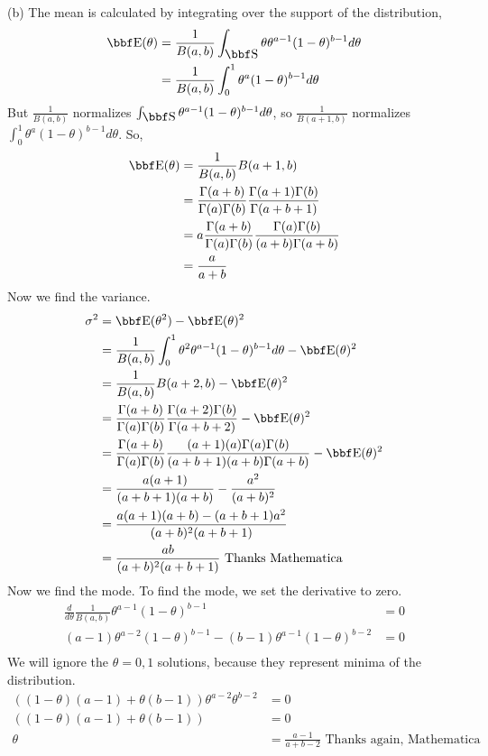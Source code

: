 \documentclass[12pt,letterpaper,fleqn]{hmcpset}
\begin{document}
\begin{solution}
    (b) The mean is calculated by integrating over the support of the distribution,
        \begin{align*}
            \EE(\theta) &= \frac{1}{B(a,b)} \int_{\SS} \theta \theta^{a-1}(1-\theta)^{b-1} d\theta \\
            &=  \frac{1}{B(a,b)} \int_{0}^1 \theta^{a}(1-\theta)^{b-1} d\theta
        \end{align*}
    But $\frac{1}{B(a,b)}$ normalizes $\int_{\SS} \theta^{a-1}(1-\theta)^{b-1} d\theta$, so $\frac{1}{B(a+1,b)}$ normalizes $\int_{0}^1 \theta^{a}(1-\theta)^{b-1} d\theta$. So,
        \begin{align*}
            \EE(\theta) &= \frac{1}{B(a,b)} B(a+1,b) \\
            &= \frac{\Gamma(a+b)}{\Gamma(a)\Gamma(b)} \frac{\Gamma(a+1)\Gamma(b)}{\Gamma(a + b +1)}\\
            &= a\frac{\Gamma(a+b)}{\Gamma(a)\Gamma(b)} \frac{\Gamma(a)\Gamma(b)}{(a+b)\Gamma(a + b)}\\
            &= \frac{a}{a+b}
        \end{align*}
        Now we find the variance. 
        \begin{align*}
            \sigma^2 &= \EE(\theta^2) - \EE(\theta)^2 \\
            &= \frac{1}{B(a,b)} \int_{0}^1 \theta^2 \theta^{a - 1}(1-\theta)^{b-1} d\theta - \EE(\theta)^2\\
            &= \frac{1}{B(a,b)} B(a+2,b) - \EE(\theta)^2 \\
            &= \frac{\Gamma(a+b)}{\Gamma(a)\Gamma(b)} \frac{\Gamma(a+2)\Gamma(b)}{\Gamma(a + b + 2)} - \EE(\theta)^2 \\
            &= \frac{\Gamma(a+b)}{\Gamma(a)\Gamma(b)} \frac{(a+1)(a)\Gamma(a)\Gamma(b)}{(a + b +1)(a+b)\Gamma(a + b)} - \EE(\theta)^2\\
            &= \frac{a(a+1)}{(a+b+1)(a+b)} - \frac{a^2}{(a+b)^2}\\
            &= \frac{a(a+1)(a+b)-(a+b+1)a^2}{(a+b)^2(a+b+1)}\\
            &= \frac{a b}{(a+b)^2 (a+b+1)} \text{  Thanks Mathematica}
        \end{align*}
        Now we find the mode. To find the mode, we set the derivative to zero.
            \begin{align*}
                \frac{d}{d \theta} \frac{1}{B(a,b)} \theta^{a-1}(1-\theta)^{b-1} &= 0\\
                (a-1)\theta^{a-2}(1-\theta)^{b-1} - (b-1)\theta^{a-1}(1-\theta)^{b-2}&=0\\   
            \end{align*}
        We will ignore the $\theta = 0,1$ solutions, because they represent minima of the distribution. 
            \begin{align*}
                ((1-\theta)(a-1) + \theta(b-1))\theta^{a-2}\theta^{b-2} &= 0\\
                ((1-\theta)(a-1) + \theta(b-1)) &= 0\\
                \theta &= \frac{a-1}{a+b-2} \text{ Thanks again, Mathematica}
            \end{align*}
    \end{solution}
\end{document}
